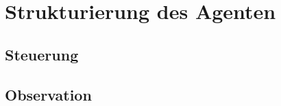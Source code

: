 \newpage
\section{Strukturierung des Agenten}
\label{struktur}
\subsection{Steuerung}
\subsection{Observation}
\label{sensorik_agent}

